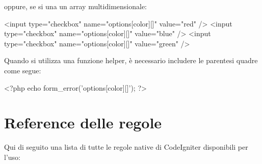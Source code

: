 oppure, se si una un array multidimensionale:

\begin{code}
<input type="checkbox" name="options[color][]" value="red" />
<input type="checkbox" name="options[color][]" value="blue" />
<input type="checkbox" name="options[color][]" value="green" />
\end{code}

Quando si utilizza una funzione helper, è necessario includere le parentesi quadre come segue:

\begin{code}
<?php echo form_error('options[color][]'); ?>
\end{code}

\section*{Reference delle regole}
Qui di seguito una lista di tutte le regole native di CodeIgniter disponibili per l'uso:

